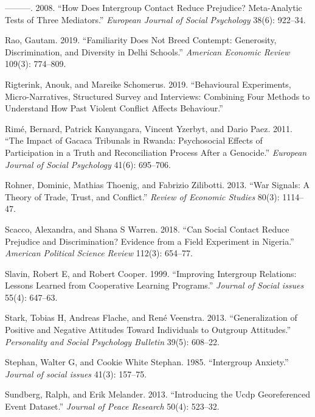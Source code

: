 \documentclass[11pt]{article}
\begin{document}
\begin{cslreferences}
\leavevmode\hypertarget{ref-pettigrew2008does}{}%
---------. 2008. ``How Does Intergroup Contact Reduce Prejudice?
Meta-Analytic Tests of Three Mediators.'' \emph{European Journal of
Social Psychology} 38(6): 922--34.

\leavevmode\hypertarget{ref-rao2019familiarity}{}%
Rao, Gautam. 2019. ``Familiarity Does Not Breed Contempt: Generosity,
Discrimination, and Diversity in Delhi Schools.'' \emph{American
Economic Review} 109(3): 774--809.

\leavevmode\hypertarget{ref-rigterink2019isa}{}%
Rigterink, Anouk, and Mareike Schomerus. 2019. ``Behavioural
Experiments, Micro-Narratives, Structured Survey and Interviews:
Combining Four Methods to Understand How Past Violent Conflict Affects
Behaviour.''

\leavevmode\hypertarget{ref-rime2011impact}{}%
Rimé, Bernard, Patrick Kanyangara, Vincent Yzerbyt, and Dario Paez.
2011. ``The Impact of Gacaca Tribunals in Rwanda: Psychosocial Effects
of Participation in a Truth and Reconciliation Process After a
Genocide.'' \emph{European Journal of Social Psychology} 41(6):
695--706.

\leavevmode\hypertarget{ref-rohner2013war}{}%
Rohner, Dominic, Mathias Thoenig, and Fabrizio Zilibotti. 2013. ``War
Signals: A Theory of Trade, Trust, and Conflict.'' \emph{Review of
Economic Studies} 80(3): 1114--47.

\leavevmode\hypertarget{ref-scacco2018nigeria}{}%
Scacco, Alexandra, and Shana S Warren. 2018. ``Can Social Contact Reduce
Prejudice and Discrimination? Evidence from a Field Experiment in
Nigeria.'' \emph{American Political Science Review} 112(3): 654--77.

\leavevmode\hypertarget{ref-slavin1999improving}{}%
Slavin, Robert E, and Robert Cooper. 1999. ``Improving Intergroup
Relations: Lessons Learned from Cooperative Learning Programs.''
\emph{Journal of Social issues} 55(4): 647--63.

\leavevmode\hypertarget{ref-stark2013generalization}{}%
Stark, Tobias H, Andreas Flache, and René Veenstra. 2013.
``Generalization of Positive and Negative Attitudes Toward Individuals
to Outgroup Attitudes.'' \emph{Personality and Social Psychology
Bulletin} 39(5): 608--22.

\leavevmode\hypertarget{ref-stephan1985intergroup}{}%
Stephan, Walter G, and Cookie White Stephan. 1985. ``Intergroup
Anxiety.'' \emph{Journal of social issues} 41(3): 157--75.

\leavevmode\hypertarget{ref-ucdp}{}%
Sundberg, Ralph, and Erik Melander. 2013. ``Introducing the Ucdp
Georeferenced Event Dataset.'' \emph{Journal of Peace Research} 50(4):
523--32.


\end{cslreferences}
\end{document}
